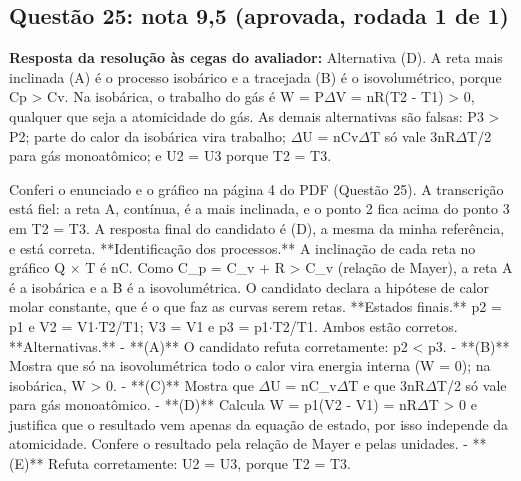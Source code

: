 \documentclass{article}%
\begin{document}
\subsection*{Questão 25: nota 9,5 (aprovada, rodada 1 de 1)}%
\textbf{Resposta da resolução às cegas do avaliador:} Alternativa (D). A reta mais inclinada (A) é o processo isobárico e a tracejada (B) é o isovolumétrico, porque Cp > Cv. Na isobárica, o trabalho do gás é W = P$\Delta$V = nR(T2 - T1) > 0, qualquer que seja a atomicidade do gás. As demais alternativas são falsas: P3 > P2; parte do calor da isobárica vira trabalho; $\Delta$U = nCv$\Delta$T só vale 3nR$\Delta$T/2 para gás monoatômico; e U2 = U3 porque T2 = T3.\par %
Conferi o enunciado e o gráfico na página 4 do PDF (Questão 25). A transcrição está fiel: a reta A, contínua, é a mais inclinada, e o ponto 2 fica acima do ponto 3 em T2 = T3.\newline%
\newline%
A resposta final do candidato é (D), a mesma da minha referência, e está correta.\newline%
\newline%
**Identificação dos processos.** A inclinação de cada reta no gráfico Q $\times$ T é nC. Como C\_p = C\_v + R > C\_v (relação de Mayer), a reta A é a isobárica e a B é a isovolumétrica. O candidato declara a hipótese de calor molar constante, que é o que faz as curvas serem retas.\newline%
\newline%
**Estados finais.** p2 = p1 e V2 = V1$\cdot$T2/T1; V3 = V1 e p3 = p1$\cdot$T2/T1. Ambos estão corretos.\newline%
\newline%
**Alternativas.**\newline%
{-} **(A)** O candidato refuta corretamente: p2 < p3.\newline%
{-} **(B)** Mostra que só na isovolumétrica todo o calor vira energia interna (W = 0); na isobárica, W > 0.\newline%
{-} **(C)** Mostra que $\Delta$U = nC\_v$\Delta$T e que 3nR$\Delta$T/2 só vale para gás monoatômico.\newline%
{-} **(D)** Calcula W = p1(V2 - V1) = nR$\Delta$T > 0 e justifica que o resultado vem apenas da equação de estado, por isso independe da atomicidade. Confere o resultado pela relação de Mayer e pelas unidades.\newline%
{-} **(E)** Refuta corretamente: U2 = U3, porque T2 = T3.\newline%
\end{document}
